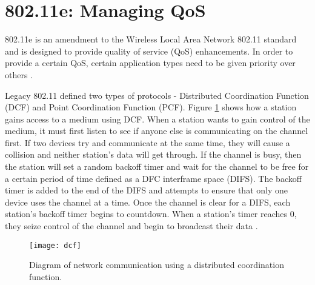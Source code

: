 \documentclass[12pt]{article}
\begin{document}
\section{802.11e: Managing QoS}
802.11e is an amendment to the Wireless Local Area Network 802.11 standard and is designed to provide quality of service (QoS) enhancements.  In order to provide a certain QoS, certain application types need to be given priority over others \cite{Thottan:2006:IEM:1234161.1234187}.

Legacy 802.11 defined two types of protocols - Distributed Coordination Function (DCF) and Point Coordination Function (PCF).  Figure \ref{fig:dcf} shows how a station gains access to a medium using DCF.  When a station wants to gain control of the medium, it must first listen to see if anyone else is communicating on the channel first.  If two devices try and communicate at the same time, they will cause a collision and neither station's data will get through. If the channel is busy, then the station will set a random backoff timer and wait for the channel to be free for a certain period of time defined as a DFC interframe space (DIFS).  The backoff timer is added to the end of the DIFS and attempts to ensure that only one device uses the channel at a time.  Once the channel is clear for a DIFS, each station's backoff timer begins to countdown.  When a station's timer reaches 0, they seize control of the channel and begin to broadcast their data \cite{Thottan:2006:IEM:1234161.1234187}.

\begin{figure}[htp]
  \begin{center}
    \texttt{[image: dcf]}
    \caption{Diagram of network communication using a distributed coordination function.}
    \label{fig:dcf}
  \end{center}
\end{figure}
\end{document}
